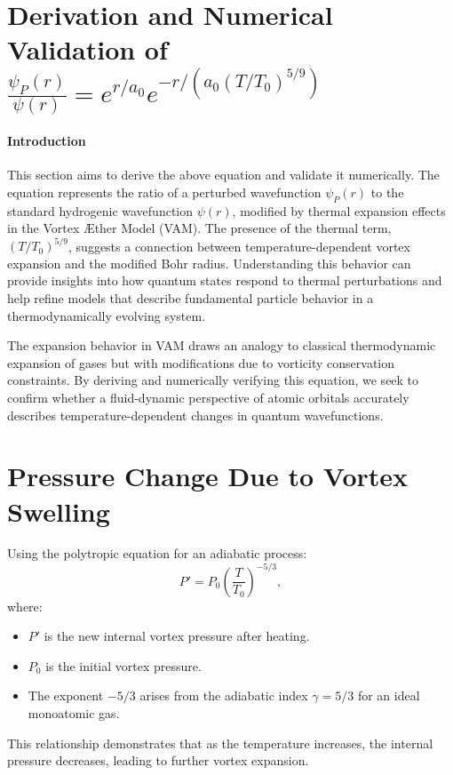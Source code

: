 
  \section{Derivation and Numerical Validation of $\frac{\psi_P(r)}{\psi(r)} = e^{r/a_0} e^{-r / (a_0 (T/T_0)^{5/9})}$}

  \paragraph*{Introduction}
  This section aims to derive the above equation and validate it numerically. The equation represents the ratio of a perturbed wavefunction $\psi_P(r)$ to the standard hydrogenic wavefunction $\psi(r)$, modified by thermal expansion effects in the Vortex Æther Model (VAM). The presence of the thermal term, $(T/T_0)^{5/9}$, suggests a connection between temperature-dependent vortex expansion and the modified Bohr radius. Understanding this behavior can provide insights into how quantum states respond to thermal perturbations and help refine models that describe fundamental particle behavior in a thermodynamically evolving system.

  The expansion behavior in VAM draws an analogy to classical thermodynamic expansion of gases but with modifications due to vorticity conservation constraints. By deriving and numerically verifying this equation, we seek to confirm whether a fluid-dynamic perspective of atomic orbitals accurately describes temperature-dependent changes in quantum wavefunctions.

  \section{Pressure Change Due to Vortex Swelling}
  Using the polytropic equation for an adiabatic process:
  \begin{equation*}
    P' = P_0 \left( \frac{T}{T_0} \right)^{-5/3},
  \end{equation*}
  where:
  \begin{itemize}
    \item $P'$ is the new internal vortex pressure after heating.
    \item $P_0$ is the initial vortex pressure.
    \item The exponent $-5/3$ arises from the adiabatic index $\gamma = 5/3$ for an ideal monoatomic gas.
  \end{itemize}
  This relationship demonstrates that as the temperature increases, the internal pressure decreases, leading to further vortex expansion.


